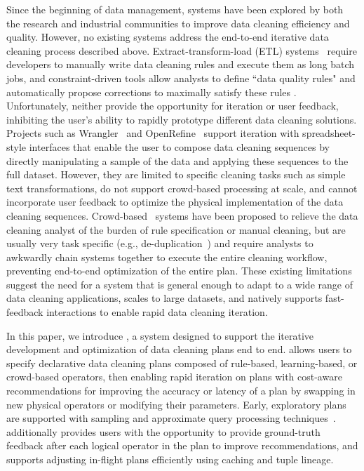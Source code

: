 Since the beginning of data management, systems have been explored by both the research and industrial communities to improve data cleaning efficiency and quality.
However, no existing systems address the end-to-end iterative data cleaning process described above.
Extract-transform-load (ETL) systems~\cite{informatica,talend,apachefalcon} require developers to manually write data cleaning rules and execute them as long batch jobs, 
and constraint-driven tools allow analysts to define ``data quality rules" and automatically propose corrections to maximally satisfy these rules \cite{DBLP:conf/sigmod/DallachiesaEEEIOT13}.
Unfortunately, neither provide the opportunity for iteration or user feedback, inhibiting the user's ability to rapidly prototype different data cleaning solutions.
Projects such as Wrangler~\cite{wrangler,trifacta} and OpenRefine~\cite{openrefine} support iteration with spreadsheet-style interfaces that enable the user to compose data cleaning sequences by directly manipulating a sample of the data and applying these sequences to the full dataset.
However, they are limited to specific cleaning tasks such as simple text transformations, do not support crowd-based processing at scale, and cannot incorporate user feedback to optimize the physical implementation of the data cleaning sequences.
Crowd-based~\cite{gokhale2014corleone,stonebraker2013data} systems have been proposed to relieve the data cleaning analyst of the burden of rule specification or manual cleaning, but are usually very task specific (e.g., de-duplication~\cite{gokhale2014corleone,park2014crowdfill,eracer,chen2014integrating}) and require analysts to awkwardly chain systems together to execute the entire cleaning workflow, preventing end-to-end optimization of the entire plan.
These existing limitations suggest the need for a system that is general enough to adapt to a wide range of data cleaning applications, scales to large datasets, and natively supports fast-feedback interactions to enable rapid data cleaning iteration.

In this paper, we introduce \sys, a system designed to support the iterative development and optimization of data cleaning plans end to end.
\sys allows users to specify declarative data cleaning plans composed of rule-based, learning-based, or crowd-based operators, then enabling rapid iteration on plans with cost-aware recommendations for improving the accuracy or latency of a plan by swapping in new physical operators or modifying their parameters.
Early, exploratory plans are supported with sampling and approximate query processing techniques~\cite{wang1999sample}.
\sys additionally provides users with the opportunity to provide ground-truth feedback after each logical operator in the plan to improve recommendations, and supports adjusting in-flight plans efficiently using caching and tuple lineage.


